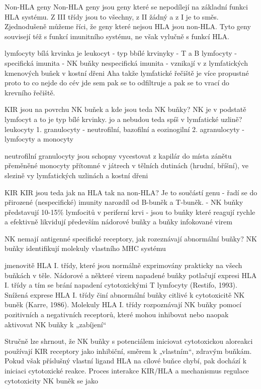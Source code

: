 \documentclass[czech,DP]{thesiskiv}
\begin{document}
Non-HLA geny
Non-HLA geny jsou geny které se nepodílejí na základní funkci HLA systému. Z III třídy jsou to všechny, z II žádný a z I je to směs. Zjednodušeně můžeme říci, že geny které nejsou HLA jsou non-HLA. Tyto geny souvisejí též s funkcí imunitního systému, ne však vylučně s funkcí HLA. 

lymfocyty 
bílá krvinka je leukocyt
- typ bbílé krvinyky 
- T a B lymfocyty - specifická imunita
- NK buňky nespecifická imunita
- vznikají v z lymfatických kmenových buňek v kostní dřeni
Aha takže lymfatické řečiště je více propustné proto to co nejde do cév jde sem pak se to odfiltruje a pak se to vrací do krevního řečiště.

KIR jsou na povrchu NK buňek a kde jsou teda NK buňky? 
NK je v podstatě lymfocyt a to je typ bílé krvinky. jo a nebudou teda spíš  v lymfatické uzlině? 
leukocyty 1. granulocyty - neutrofilní, bazofilní a eozinogilní
		2. agranulocyty - lymfocyty a monocyty
		
neutrofilní granulocyty jsou schopny vycestovat z kapilár do místa zánětu
přeměněné monocyty přítomné v játrech v tělních dutinách (hrudní, bříšní), ve slezině vy lymfatických uzlinách a kostní dřeni

KIR
KIR jsou teda jak na HLA tak na non-HLA? Je to součástí genu
- řadí se do přirozené (nespecifické) imunity narozdíl od B-buněk a T-buněk.
- NK buňky představují 10-15\% lymfocitů v periferní krvi
- jsou to buňky které reagují rychle a efektivně likvidují především nádorové buňky a buňky infokované virem

NK nemají antigenné specifické receptory, jak rozeznávají abnormální buňky? 
NK buňky identifikují molekuly vlastního MHC systému 

 jmenovitě HLA I. třídy, které jsou normálně exprimovány
prakticky na všech buňkách v těle. Nádorové a některé virem napadené buňky potlačují
expresi HLA I. třídy a tím se brání napadení cytotoxickými T lymfocyty (Restifo, 1993).
Snížená exprese HLA I. třídy činí abnormální buňky citlivé k cytotoxicitě NK buněk (Karre,
1986). Molekuly HLA I. třídy rozpoznávají NK buňky pomocí pozitivních a negativních 
receptorů, které mohou inhibovat nebo naopak aktivovat NK buňky k „zabíjení“

Stručně lze shrnout, že NK buňky s potenciálem iniciovat cytotoxickou aloreakci používají
KIR receptory jako inhibiční, směrem k „vlastním“, zdravým buňkám. Pokud však příslušný
vlastní ligand HLA na cílové buňce chybí, pak dochází k iniciaci cytotoxické reakce. Proces
interakce KIR/HLA a mechanismus regulace cytotoxicity NK buněk se jako 
\end{document}
